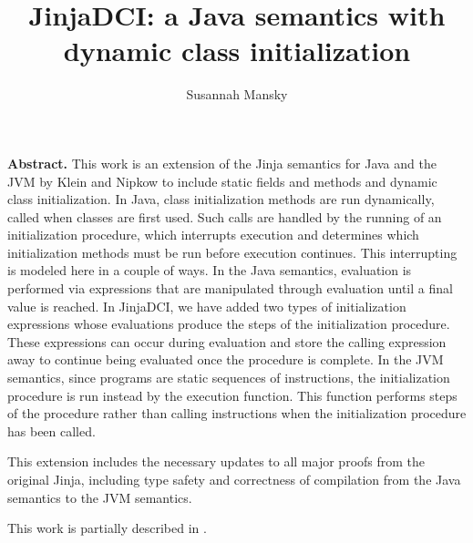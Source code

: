 \documentclass[11pt,a4paper]{book}
\begin{document}
\title{JinjaDCI: a Java semantics with dynamic class initialization}
\author{Susannah Mansky}
\maketitle

\begin{trivlist}
\item \textbf{Abstract.}
This work is an extension of the Jinja semantics for Java and the JVM by Klein and Nipkow to include static fields and methods and dynamic class initialization.
In Java, class initialization methods are run dynamically, called when classes are first used. Such calls are handled by the running of an initialization procedure, which interrupts execution and determines which initialization methods must be run before execution continues. This interrupting is modeled here in a couple of ways.
In the Java semantics, evaluation is performed via expressions that are manipulated through evaluation until a final value is reached. In JinjaDCI, we have added two types of initialization expressions whose evaluations produce the steps of the initialization procedure. These expressions can occur during evaluation and store the calling expression away to continue being evaluated once the procedure is complete.
In the JVM semantics, since programs are static sequences of instructions, the initialization procedure is run instead by the execution function. This function performs steps of the procedure rather than calling instructions when the initialization procedure has been called.

This extension includes the necessary updates to all major proofs from the original Jinja, including type safety and correctness of compilation from the Java semantics to the JVM semantics.

This work is partially described in \cite{mansky2019dynamic}.
\end{trivlist}


\tableofcontents




\clearpage



%

\end{document}

